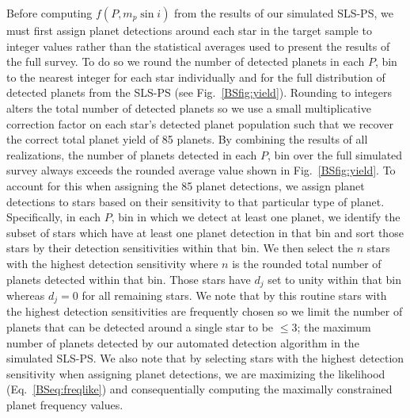 Before computing $f(P,m_p\sin{i})$ from the results of our simulated SLS-PS, we must first assign planet
detections around each star in the target sample to integer values rather than the statistical
averages used to present the results of the full survey. To do so we round the number of detected planets
in each $P$, \msini{} bin to the nearest integer for each star individually and for the full distribution
of detected planets from the SLS-PS (see Fig.~\ref{BSfig:yield}). Rounding to integers
alters the total number of detected
planets so we use a small multiplicative correction factor on each star's detected planet population such
that we recover the correct total planet yield of 85 planets. By combining the results of all
realizations, the number of planets detected in each $P$, \msini{} bin over the full simulated survey
always exceeds the rounded average value shown in Fig.~\ref{BSfig:yield}. To account for this when
assigning the 85 planet detections, we assign planet detections to stars based on their sensitivity
to that particular type of planet. Specifically, in each $P$, \msini{} bin in which
we detect at least one planet, we identify the subset of stars which have at least one planet
detection in that bin and
sort those stars by their detection sensitivities within that bin. We then select the $n$ stars with the highest
detection sensitivity where $n$ is the rounded total number of planets detected within that bin.
Those stars have $d_j$ set to unity within that bin whereas $d_j=0$ for all remaining stars.
We note that by this routine stars
with the highest detection sensitivities are frequently chosen so we limit the number of planets that can be
detected around a single star to be $\leq 3$; the maximum number of planets detected by our automated
detection algorithm in the simulated SLS-PS. We also note that by selecting stars with the highest
detection sensitivity when assigning planet detections, we are maximizing the likelihood
(Eq.~\ref{BSeq:freqlike}) and consequentially computing the maximally constrained planet frequency values.

